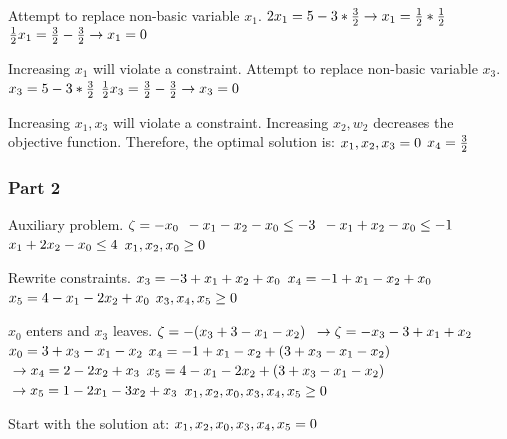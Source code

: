 \documentclass[17pt]{extarticle}
\begin{document}
\bigskip Attempt to replace non-basic variable $x_1$.
$\\ 2x_1 = 5 - 3 * \frac{3}{2} \to x_1 = \frac{1}{2} * \frac{1}{2}$
$\\ \frac{1}{2}x_1 = \frac{3}{2} - \frac{3}{2} \to x_1 = 0$

\bigskip Increasing $x_1$ will violate a constraint. Attempt to replace non-basic variable $x_3$.
$\\ x_3 = 5 - 3 * \frac{3}{2}$
$\\ \frac{1}{2}x_3 = \frac{3}{2} - \frac{3}{2} \to x_3 = 0$

\bigskip Increasing $x_1, x_3$ will violate a constraint. Increasing $x_2, w_2$ decreases the objective function. Therefore, the optimal solution is:
$\\x_1, x_2, x_3 = 0$
$\\x_4 = \frac{3}{2}$

\subsubsection*{Part 2}
Auxiliary problem.
$\\\zeta = -x_0$
$\\ -x_1 - x_2 - x_0 \leq -3$
$\\ -x_1 + x_2 - x_0 \leq -1$
$\\ x_1 + 2x_2 - x_0 \leq 4$
$\\ x_1, x_2, x_0 \geq 0$

\bigskip Rewrite constraints.
$\\ x_3 = - 3 + x_1 + x_2 + x_0$
$\\ x_4 = - 1 + x_1 - x_2 + x_0$
$\\ x_5 = 4 - x_1 - 2x_2 + x_0$
$\\ x_3, x_4, x_5 \geq 0$

\bigskip $x_0$ enters and $x_3$ leaves.
$\\\zeta = -(x_3 + 3 - x_1 - x_2)$
$\\\to \zeta = -x_3 - 3 + x_1 + x_2$
$\\ x_0 = 3 + x_3 - x_1 - x_2$
$\\ x_4 = - 1 + x_1 - x_2 + (3 + x_3 - x_1 - x_2)$
$\\\to x_4 = 2 - 2x_2 + x_3$
$\\ x_5 = 4 - x_1 - 2x_2 + (3 + x_3 - x_1 - x_2)$
$\\\to x_5 = 1 - 2x_1 - 3x_2 + x_3$
$\\ x_1, x_2, x_0, x_3, x_4, x_5 \geq 0$

\bigskip Start with the solution at:
$\\x_1, x_2, x_0, x_3, x_4, x_5 = 0$
\end{document}
